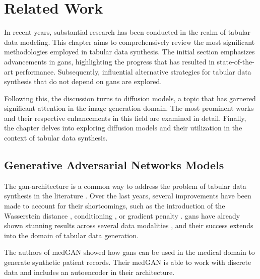 \chapter{Related Work}
\label{ch:relatedWork}

In recent years, substantial research has been conducted in the realm of tabular data modeling. 
This chapter aims to comprehensively review the most significant methodologies employed in tabular data synthesis. 
The initial section emphasizes advancements in \glspl{gan}, highlighting the progress that has resulted in state-of-the-art performance. 
Subsequently, influential alternative strategies for tabular data synthesis that do not depend on \glspl{gan} are explored.

Following this, the discussion turns to diffusion models, a topic that has garnered significant attention in the image generation domain. 
The most prominent works and their respective enhancements in this field are examined in detail.
Finally, the chapter delves into exploring diffusion models and their utilization in the context of tabular data synthesis.

\section{Generative Adversarial Networks Models}
\label{ch:relatedWork-generativeAdversarialNetworksModels}

The \gls{gan}-architecture is a common way to address the problem of tabular data synthesis in the literature \cite{borisov2022DeepNeuralNetworks}.
Over the last years, several improvements have been made to account for their shortcomings, such as the introduction of the Wasserstein \cite{frogner2015LearningWassersteinLoss} distance \cite{arjovsky2017WassersteinGenerativeAdversarial}, conditioning \cite{mirza2014ConditionalGenerativeAdversarial}, or gradient penalty \cite{gulrajani2017ImprovedTrainingWasserstein}.
\Glspl{gan} have already shown stunning results across several data modalities \cite{mckeever2020SynthesisingTabularDatasets}, and their success extends into the domain of tabular data generation.

The authors of medGAN \cite{choi2017GeneratingMultilabelDiscrete} showed how \glspl{gan} can be used in the medical domain to generate synthetic patient records.
Their medGAN is able to work with discrete data and includes an autoencoder in their architecture.

